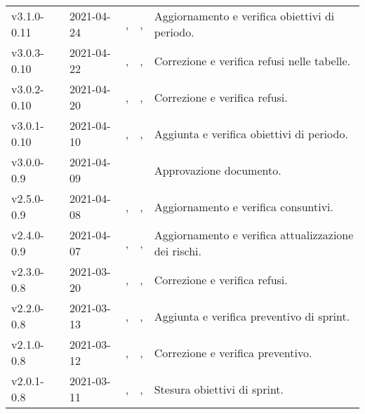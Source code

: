 {\begin{longtable}{C{.131777\freewidth} C{.134036\freewidth} C{.263554\freewidth} C{.188254\freewidth} C{.282379\freewidth}}
		v3.1.0-0.11 & 2021-04-24 & \Francesco{}, \newline{} \Daniele{} & \ver{}, \newline{} \progr{} & Aggiornamento e verifica obiettivi di periodo. \\
		v3.0.3-0.10 & 2021-04-22 & \Tommaso{}, \newline{} \Lucrezia{} & \ver{}, \newline{} \progr{} & Correzione e verifica refusi nelle tabelle. \\
		v3.0.2-0.10 & 2021-04-20 & \Francesco{}, \newline{} \Daniele{} & \ver{}, \newline{} \progr{} & Correzione e verifica refusi. \\
		v3.0.1-0.10 & 2021-04-10 & \Francesco{}, \newline{} \Daniele{} & \ver{}, \newline{} \progr{} & Aggiunta e verifica obiettivi di periodo. \\
		v3.0.0-0.9 & 2021-04-09 & \Tommaso{} & \RdP{} & Approvazione documento. \\
		v2.5.0-0.9 & 2021-04-08 & \Daniele{}, \newline{} \Davide{} & \ver{},\newline{} \progr{} & Aggiornamento e verifica consuntivi. \\
		v2.4.0-0.9 & 2021-04-07 & \Lucrezia{}, \newline{} \Davide{} & \ver{},\newline{} \progr{} & Aggiornamento e verifica attualizzazione dei rischi. \\
		v2.3.0-0.8 & 2021-03-20 & \Giosue{}, \newline{} \Francesco{} & \ver{}, \newline{} \prog{} & Correzione e verifica refusi. \\
		v2.2.0-0.8 & 2021-03-13 & \Daniele{}, \newline{} \Davide{} & \ver{},\newline{} \progr{} & Aggiunta e verifica preventivo di sprint. \\
		v2.1.0-0.8 & 2021-03-12 & \Lucrezia{},\newline{} \Matteo{} & \ver{},\newline{} \prog{} & Correzione e verifica preventivo. \\
		v2.0.1-0.8 & 2021-03-11 & \Daniele{},\newline{} \Davide{} & \ver{},\newline{} \progr{} & Stesura obiettivi di sprint. \\

\end{longtable}}

